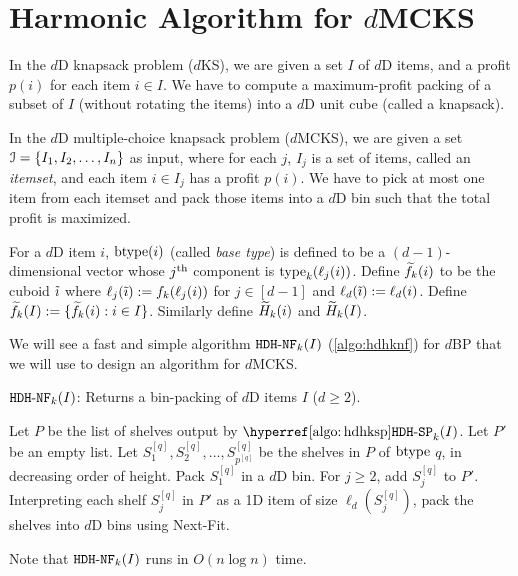 \section{Harmonic Algorithm for \texorpdfstring{$d$}{d}MCKS}
\label{sec:hdhks}

In the $d$D knapsack problem ($d$KS), we are given a set $I$ of $d$D items,
and a profit $p(i)$ for each item $i \in I$. We have to compute
a maximum-profit packing of a subset of $I$ (without rotating the items)
into a $d$D unit cube (called a knapsack).

In the $d$D multiple-choice knapsack problem ($d$MCKS),
we are given a set $\mathcal{I} = \{I_1, I_2, \ldots, I_n\}$ as input,
where for each $j$, $I_j$ is a set of items, called an {\em itemset},
and each item $i \in I_j$ has a profit $p(i)$.
We have to pick at most one item from each itemset and pack those items
into a $d$D bin such that the total profit is maximized.

For a $d$D item $i$, $\operatorname{btype}(i)$ (called \emph{base type}) is defined to be
a $(d-1)$-dimensional vector whose $j^{\textrm{th}}$ component is $\operatorname{type}_k(\ell_j(i))$.
Define $\widetilde{f}_{k}(i)$ to be the cuboid $\tilde{\imath}$ where $\ell_j(\tilde{\imath}) := f_k(\ell_j(i))$
for $j \in [d-1]$ and $\ell_d(\tilde{\imath}) := \ell_d(i)$.
Define $\widetilde{f}_{k}(I) := \{\widetilde{f}_{k}(i): i \in I\}$.
Similarly define $\widetilde{H}_{k}(i)$ and $\widetilde{H}_{k}(I)$.

We will see a fast and simple algorithm $\operatorname{\mathtt{HDH-NF}}_{k}(I)$ (\cref{algo:hdhknf}) for $d$BP
that we will use to design an algorithm for $d$MCKS.

\begin{algorithm}[!ht]
\caption{$\operatorname{\mathtt{HDH-NF}}_{k}(I)$:
Returns a bin-packing of $d$D items $I$ ($d \ge 2$).}
\label{algo:hdhknf}
\begin{algorithmic}[1]
\State Let $P$ be the list of shelves output by $\hdhkspHyp(I)$.
\State Let $P'$ be an empty list.
    \State Let $S_1^{[q]}, S_2^{[q]}, \ldots, S_{p^{[q]}}^{[q]}$
        be the shelves in $P$ of $\operatorname{btype}$ $q$, in decreasing order of height.
    \State Pack $S_1^{[q]}$ in a $d$D bin.
    \State For $j \ge 2$, add $S_j^{[q]}$ to $P'$.
\EndFor
\State Interpreting each shelf $S_j^{[q]}$ in $P'$ as a 1D item of size $\ell_d(S_j^{[q]})$,
    pack the shelves into $d$D bins using Next-Fit.
\end{algorithmic}
\end{algorithm}

Note that $\operatorname{\mathtt{HDH-NF}}_{k}(I)$ runs in $O(n\log n)$ time.

